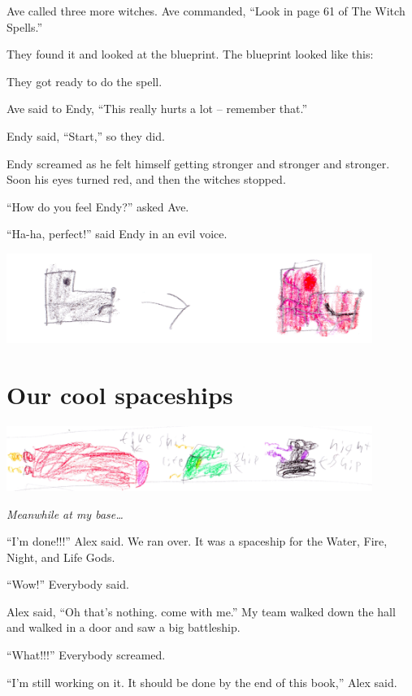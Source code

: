 \documentclass[booklet, twoside, 12pt]{krantz}
\begin{document}
Ave called three more witches. Ave commanded, ``Look in page 61 of The
Witch Spells.''

They found it and looked at the blueprint. The blueprint looked like
this:

They got ready to do the spell.

Ave said to Endy, ``This really hurts a lot -- remember that.''

Endy said, ``Start,'' so they did.

Endy screamed as he felt himself getting stronger and stronger and
stronger. Soon his eyes turned red, and then the witches stopped.

``How do you feel Endy?'' asked Ave.

``Ha-ha, perfect!'' said Endy in an evil voice.

\includegraphics[width=4.6875in,height=\textheight]{img/four-bad-guys/endy.jpg}

\hypertarget{our-cool-spaceships}{%
\section{Our cool spaceships}\label{our-cool-spaceships}}

\includegraphics[width=4.6875in,height=\textheight]{img/four-bad-guys/threeships.jpg}

\emph{Meanwhile at my base\ldots{}}

``I'm done!!!'' Alex said. We ran over. It was a spaceship for the
Water, Fire, Night, and Life Gods.

``Wow!'' Everybody said.

Alex said, ``Oh that's nothing. come with me.'' My team walked down the
hall and walked in a door and saw a big battleship.

``What!!!'' Everybody screamed.

``I'm still working on it. It should be done by the end of this book,''
Alex said.
\end{document}
